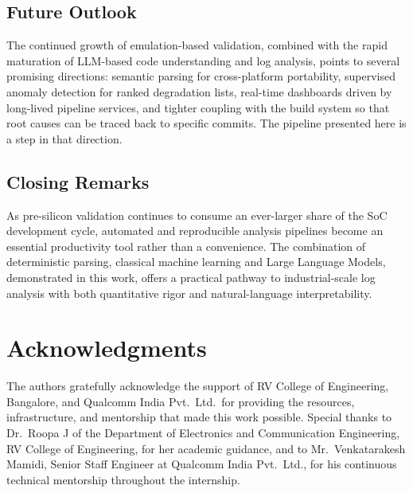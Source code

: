 \documentclass[conference]{IEEEtran}
\begin{document}
\subsection{Future Outlook}
The continued growth of emulation-based validation, combined with the rapid maturation of LLM-based code understanding and log analysis, points to several promising directions: semantic parsing for cross-platform portability, supervised anomaly detection for ranked degradation lists, real-time dashboards driven by long-lived pipeline services, and tighter coupling with the build system so that root causes can be traced back to specific commits. The pipeline presented here is a step in that direction.

\subsection{Closing Remarks}
As pre-silicon validation continues to consume an ever-larger share of the SoC development cycle, automated and reproducible analysis pipelines become an essential productivity tool rather than a convenience. The combination of deterministic parsing, classical machine learning and Large Language Models, demonstrated in this work, offers a practical pathway to industrial-scale log analysis with both quantitative rigor and natural-language interpretability.

\section*{Acknowledgments}
The authors gratefully acknowledge the support of RV College of Engineering, Bangalore, and Qualcomm India Pvt.\ Ltd.\ for providing the resources, infrastructure, and mentorship that made this work possible. Special thanks to Dr.\ Roopa J of the Department of Electronics and Communication Engineering, RV College of Engineering, for her academic guidance, and to Mr.\ Venkatarakesh Mamidi, Senior Staff Engineer at Qualcomm India Pvt.\ Ltd., for his continuous technical mentorship throughout the internship.
\end{document}
